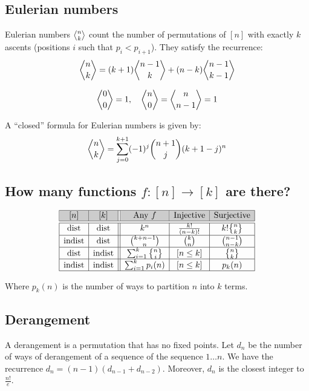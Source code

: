 \newcommand{\eulerian}[2]{\genfrac{\langle}{\rangle}{0pt}{}{#1}{#2}}
\subsection{Eulerian numbers} 
Eulerian numbers $\eulerian{n}{k}$ count the number of permutations of $[n]$ with exactly $k$ ascents (positions $i$ such that $p_i < p_{i + 1}$). They satisfy the recurrence:
\begin{equation*}
    \eulerian{n}{k} = (k+1)\eulerian{n-1}{k} + (n-k)\eulerian{n-1}{k-1}
\end{equation*}

\begin{equation*}
    \eulerian{0}{0} = 1, \quad \eulerian{n}{0} = \eulerian{n}{n-1} = 1
\end{equation*}

A ``closed'' formula for Eulerian numbers is given by:
\begin{equation*}
    \eulerian{n}{k} = \sum_{j=0}^{k+1} (-1)^j \binom{n+1}{j} (k+1-j)^n
\end{equation*}

\subsection{How many functions \texorpdfstring{$f \colon [n] \rightarrow [k]$}{} are there?} 

$$
\begin{array}{|c|c||c|c|c|}
    \hline
    \cellcolor{gray!40} [n] & \cellcolor{gray!40} [k] & \cellcolor{gray!40} \text{Any } f & \cellcolor{gray!40} \text{Injective} & \cellcolor{gray!40} \text{Surjective}
    \\ \hline \hline \text{dist} & \text{dist} & k^n & \frac{k!}{(n-k)!} & k!\stirlingsecond{n}{k}
    \\ \hline \text{indist} & \text{dist} & \binom{k+n-1}{n} & \binom{k}{n} & \binom{n-1}{n-k}
    \\ \hline \text{dist} & \text{indist} & \sum_{i = 1}^k \stirlingsecond{n}{i} & [n \le k] & \stirlingsecond{n}{k}
    \\ \hline \text{indist} & \text{indist} & \sum_{i = 1}^k p_i(n) & [n \le k] & p_k(n)\\
    \hline
\end{array}
$$

Where $p_k(n)$ is the number of ways to partition $n$ into $k$ terms.

    
\subsection{Derangement} A derangement is a permutation that has no fixed points. Let $d_n$ be the number of ways of derangement of a sequence of the sequence $1\dots n$. We have the recurrence $d_n=(n-1)(d_{n-1}+d_{n-2})$. Moreover, $d_n$ is the closest integer to $\frac{n!}{e}$.

